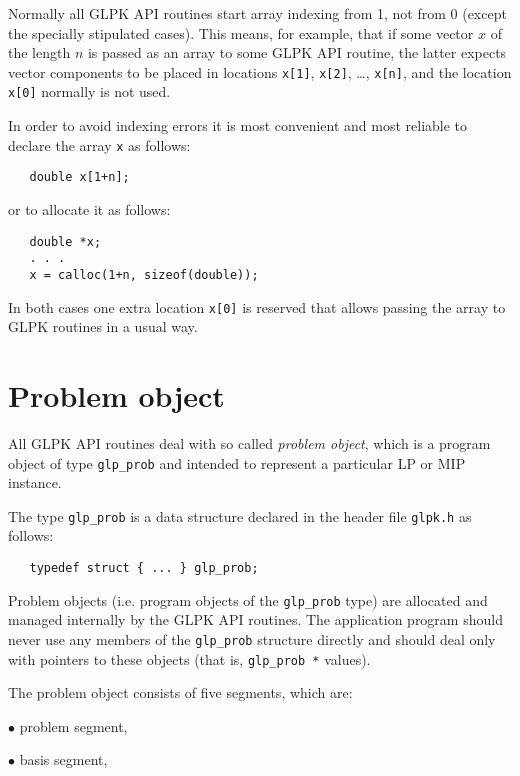 Normally all GLPK API routines start array indexing from 1, not from 0
(except the specially stipulated cases). This means, for example, that
if some vector $x$ of the length $n$ is passed as an array to some GLPK
API routine, the latter expects vector components to be placed in
locations \verb|x[1]|, \verb|x[2]|, \dots, \verb|x[n]|, and the location
\verb|x[0]| normally is not used.

In order to avoid indexing errors it is most convenient and most
reliable to declare the array \verb|x| as follows:

\begin{verbatim}
   double x[1+n];
\end{verbatim}

\noindent
or to allocate it as follows:

\begin{verbatim}
   double *x;
   . . .
   x = calloc(1+n, sizeof(double));
\end{verbatim}

\noindent
In both cases one extra location \verb|x[0]| is reserved that allows
passing the array to GLPK routines in a usual way.

\section{Problem object}

All GLPK API routines deal with so called {\it problem object}, which
is a program object of type \verb|glp_prob| and intended to represent
a particular LP or MIP instance.

The type \verb|glp_prob| is a data structure declared in the header
file \verb|glpk.h| as follows:

\begin{verbatim}
   typedef struct { ... } glp_prob;
\end{verbatim}

Problem objects (i.e. program objects of the \verb|glp_prob| type) are
allocated and managed internally by the GLPK API routines. The
application program should never use any members of the \verb|glp_prob|
structure directly and should deal only with pointers to these objects
(that is, \verb|glp_prob *| values).

\pagebreak

The problem object consists of five segments, which are:

$\bullet$ problem segment,

$\bullet$ basis segment,


